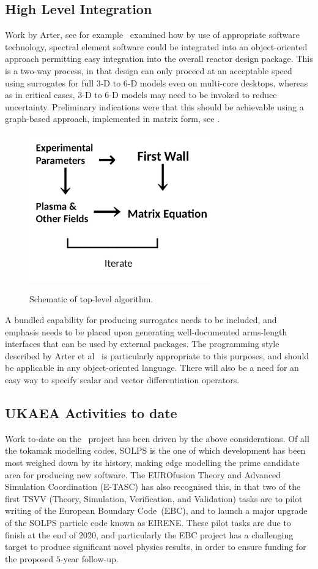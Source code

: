 \subsection{High Level Integration}\label{sec:hilevel}
Work by Arter, see for example~\cite{Ar18Reac-ppt} 
examined how by use of appropriate software technology, spectral
element software could be integrated into  an object-oriented approach permitting
easy integration into the overall reactor design package.
This is a two-way process, in that design can only proceed at an acceptable
speed using surrogates for full 3-D to 6-D models even on multi-core desktops,
whereas as in critical cases, 3-D to 6-D models may need to be invoked to
reduce uncertainty. Preliminary indications were that this should be achievable
using a graph-based approach, implemented in matrix form, see .
\begin{figure}[h]
\centerline{{\includegraphics[width=8.0cm]{../png/matrixcode.png}}
}
\caption{Schematic of top-level algorithm.
\label{fig:matrixcode}}
\end{figure}
A bundled capability for producing surrogates needs to be included, and
emphasis needs to be placed upon generating well-documented arms-length interfaces that
can be used by external packages. The programming style described by Arter
et al~\cite{fprog} is particularly appropriate to this purposes, and should be
applicable in any object-oriented language.
There will also be a need for an easy way to specify scalar and vector differentiation
operators.

\subsection{UKAEA Activities to date}\label{sec:todate}
Work to-date on the \nep \ project has been driven by the above considerations. 
Of all the tokamak modelling codes, SOLPS is the one of which development has
been most weighed down by its history, making edge modelling the prime candidate area
for producing new software. The EUROfusion Theory and Advanced Simulation Coordination (E-TASC)
has also recognised this, in that two of the first TSVV
(Theory, Simulation, Verification, and Validation) tasks are to pilot writing of
the European Boundary Code~(EBC), and to launch a major upgrade of the SOLPS
particle code known as EIRENE. These pilot tasks are due to finish at the end of 2020,
and particularly the EBC project has a challenging target to produce significant 
novel physics results, in order to ensure funding for the proposed $5$-year follow-up.

